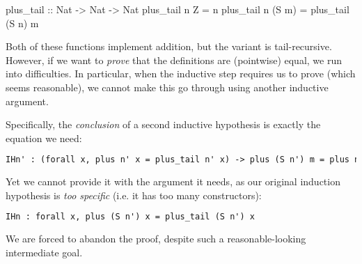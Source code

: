 \documentclass[]{article}
\begin{document}
plus_tail :: Nat -> Nat -> Nat
plus_tail n  Z    = n
plus_tail n (S m) = plus_tail (S n) m
\fi

Both of these functions implement addition, but the  variant is tail-recursive. However, if we want to \emph{prove} that the definitions are (pointwise) equal, we run into difficulties. In particular, when the inductive step requires us to prove  (which seems reasonable), we cannot make this go through using another inductive argument.

\iffalse

\begin{lstlisting}[language=ML, xleftmargin=.2\textwidth, xrightmargin=.2\textwidth]
(* Solve equalities by beta-normalising both sides *)
Ltac triv := try (simpl; reflexivity).

(* Prove equivalence of plus and plus_tail *)
Theorem equiv : forall n m, plus n m = plus_tail n m.
  induction n; triv. (* Base case is trivial *)

  (* Inductive case: plus (S n) m = plus_tail (S n) m *)
  intro m.

  (* Beta-reduce the right-hand-side (justification is trivial) *)
  replace (plus_tail (S n) m) with (plus_tail n (S m)); triv.

  (* Use induction hypothesis to replace plus_tail with plus *)
  rewrite <- (IHn (S m)).
\end{lstlisting}

\fi

Specifically, the \emph{conclusion} of a second inductive hypothesis is exactly the equation we need:

\begin{lstlisting}[language=ML, xleftmargin=.2\textwidth, xrightmargin=.2\textwidth]
IHn' : (forall x, plus n' x = plus_tail n' x) -> plus (S n') m = plus n' (S m)
\end{lstlisting}

Yet we cannot provide it with the argument it needs, as our original induction hypothesis is \emph{too specific} (i.e. it has too many  constructors):

\begin{lstlisting}[language=ML, xleftmargin=.2\textwidth, xrightmargin=.2\textwidth]
IHn : forall x, plus (S n') x = plus_tail (S n') x
\end{lstlisting}

We are forced to abandon the proof, despite such a reasonable-looking intermediate goal.
\end{document}
